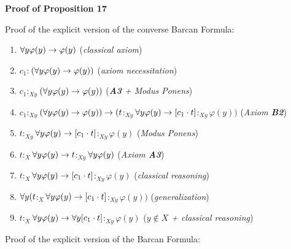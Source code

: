 
\textbf{Proof of Proposition 17}

\qquad Proof of the explicit version of the converse Barcan Formula:

\begin{enumerate}[1.]
	\item $ \forall y \varphi(y) \rightarrow \varphi(y)$   (\textit{classical axiom}) 
	\item $c_{1}$$:$$(\forall y \varphi(y) \rightarrow \varphi(y))$  (\textit{axiom necessitation})
	\item $c_{1}$$:_{Xy}$$(\forall y \varphi(y) \rightarrow \varphi(y))$  (\textit{\textbf{A3} + Modus Ponens})
	\item $c_{1}$$:_{Xy}$$(\forall y \varphi(y) \rightarrow \varphi(y)) \rightarrow  (t$$:_{Xy}$$\forall y \varphi(y)  \rightarrow   [c_{1} \cdot t]$$:_{Xy}$$ \varphi(y))$  (\textit{Axiom \textbf{B2}})
	\item $t$$:_{Xy}$$\forall y \varphi(y)  \rightarrow   [c_{1} \cdot t]$$:_{Xy}$$ \varphi(y)$  (\textit{Modus Ponens})
	\item $t$$:_{X}$$\forall y \varphi(y)  \rightarrow   t$$:_{Xy}$$\forall y \varphi(y)$  (\textit{Axiom \textbf{A3}})
	\item $t$$:_{X}$$\forall y \varphi(y)  \rightarrow   [c_{1} \cdot t]$$:_{Xy}$$ \varphi(y)$  (\textit{classical reasoning})
	\item $\forall y(t$$:_{X}$$\forall y \varphi(y)  \rightarrow   [c_{1} \cdot t]$$:_{Xy}$$ \varphi(y))$  (\textit{generalization})
	\item $t$$:_{X}$$\forall y \varphi(y)  \rightarrow   \forall y [c_{1} \cdot t]$$:_{Xy}$$ \varphi(y)$  (\textit{$y \notin X$ + classical reasoning})
	
\end{enumerate}

\pagebreak

\qquad Proof of the explicit version of the Barcan Formula:

